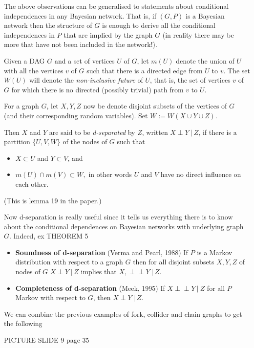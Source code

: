 \documentclass[11pt, oneside]{article}   	%
\def\ci{\perp\!\!\!\perp}
\begin{document}
The above observations can be generalised to statements about conditional independences in any Bayesian network. That is, if $(G,P)$ is a Bayesian network then the structure of $G$ is enough to derive all the conditional independences in $P$ that are implied by the graph $G$ (in reality there may be more that have not been included in the network!).

Given a DAG $G$ and a set of vertices $U$ of $G$, let $m(U)$ denote the union of $U$ with all the vertices $v$ of $G$ such that there is a directed edge from $U$ to $v$. The set $W(U)$ will denote the \emph{non-inclusive future} of $U$, that is, the set of vertices $v$ of $G$ for which there is no directed (possibly trivial) path from $v$ to $U$. 

For a graph $G$,  let $X, Y, Z$ now be denote disjoint subsets of the vertices of $G$ (and their corresponding random variables). Set $W := W(X \cup Y \cup Z)$.%

Then $X$ and $Y$ are said to be \emph{d-separated} by $Z$, written $X \perp Y   \ | \ Z$, if there is a partition $\{U,V,W\}$ of the nodes of $ G$ such that 
\begin{itemize}
\item $X \subset U$ and $Y \subset V$, and \item $m(U) \cap m(V) \subset W,$ in other words $U$ and $V$ have no direct influence on each other. \end{itemize} (This is lemma 19 in the paper.)

Now d-separation is really useful since it tells us everything there is to know about the conditional dependences on Bayesian networks with underlying graph $G$. Indeed, 
 ex
THEOREM 5

\begin{itemize} \item \textbf{Soundness of d-separation} (Verma and Pearl, 1988)
If $P$ is a Markov distribution with respect to a graph $G$ then for all disjoint subsets $X,Y,Z$ of nodes of $G$  $X \perp Y   \ | \ Z$ implies that $X,\ci Y   \ | \ Z$.
\item \textbf{Completeness of d-separation} (Meek, 1995)
If $X \ci Y   \ | \ Z$ for all $P$ Markov with respect to $G$, then $ X \perp Y   \ | \ Z$.
\end{itemize}

We can combine the previous examples of fork, collider and chain graphs to get the following

PICTURE SLIDE 9 page 35
\end{document}
